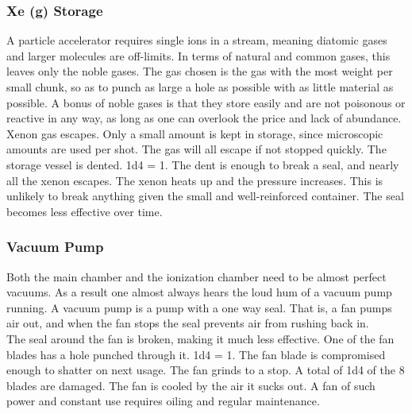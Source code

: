 \documentclass[a4paper]{article}
\begin{document}
\vspace{-0.5cm} \hspace{-18pt} \subsubsection{Xe (g) Storage} \label{ray_xe_storage} \vspace{-0.2cm}
A particle accelerator requires single ions in a stream, meaning diatomic gases and larger molecules are off-limits. In terms of natural and common gases, this leaves only the noble gases. The gas chosen is the gas with the most weight per small chunk, so as to punch as large a hole as possible with as little material as possible. A bonus of noble gases is that they store easily and are not poisonous or reactive in any way, as long as one can overlook the price and lack of abundance.
\\ \pbhw
{Xenon gas escapes. Only a small amount is kept in storage, since microscopic amounts are used per shot. The gas will all escape if not stopped quickly.}
{The storage vessel is dented. \newline \hspace{3pt} 1d4 = 1. The dent is enough to break a seal, and nearly all the xenon escapes.}
{The xenon heats up and the pressure increases. This is unlikely to break anything given the small and well-reinforced container.}
{The seal becomes less effective over time.}


\vspace{-0.5cm} \hspace{-18pt} \subsubsection{Vacuum Pump} \label{ray_vacuum_pump} \vspace{-0.2cm}
Both the main chamber and the ionization chamber need to be almost perfect vacuums. As a result one almost always hears the loud hum of a vacuum pump running. A vacuum pump is a pump with a one way seal. That is, a fan pumps air out, and when the fan stops the seal prevents air from rushing back in. 
\\ \pbhw
{The seal around the fan is broken, making it much less effective. One of the fan blades has a hole punched through it. \newline \hspace{-3pt} 1d4 = 1. The fan blade is compromised enough to shatter on next usage.}
{The fan grinds to a stop. A total of 1d4 of the 8 blades are damaged.}
{The fan is cooled by the air it sucks out.}
{A fan of such power and constant use requires oiling and regular maintenance.}
\end{document}
